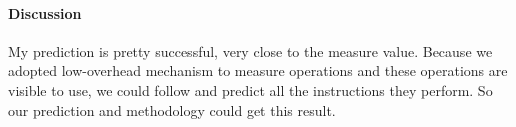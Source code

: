 \paragraph{Discussion}
My prediction is pretty successful, very close to the measure value. Because we adopted low-overhead mechanism to measure operations and these operations are visible to use, we could follow and predict all the instructions they perform. So our prediction and methodology could get this result. 

